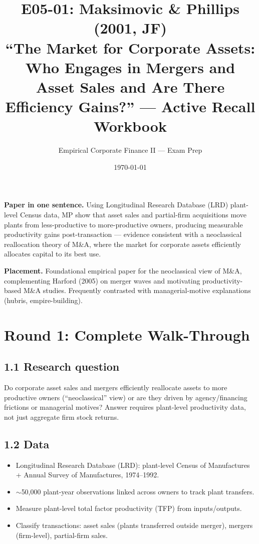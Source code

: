 \documentclass[11pt]{article}
\title{E05-01: Maksimovic \& Phillips (2001, JF) \\
\large ``The Market for Corporate Assets: Who Engages in Mergers and Asset Sales and Are There Efficiency Gains?'' --- Active Recall Workbook}
\author{Empirical Corporate Finance II --- Exam Prep}
\date{\today}
\begin{document}
\maketitle

\begin{keybox}
\textbf{Paper in one sentence.} Using Longitudinal Research Database (LRD) plant-level Census data, MP show that asset sales and partial-firm acquisitions move plants from less-productive to more-productive owners, producing measurable productivity gains post-transaction --- evidence consistent with a neoclassical reallocation theory of M\&A, where the market for corporate assets efficiently allocates capital to its best use.

\textbf{Placement.} Foundational empirical paper for the neoclassical view of M\&A, complementing Harford (2005) on merger waves and motivating productivity-based M\&A studies. Frequently contrasted with managerial-motive explanations (hubris, empire-building).
\end{keybox}

\section*{Round 1: Complete Walk-Through}

\subsection*{1.1 Research question}
Do corporate asset sales and mergers efficiently reallocate assets to more productive owners (``neoclassical'' view) or are they driven by agency/financing frictions or managerial motives? Answer requires plant-level productivity data, not just aggregate firm stock returns.

\subsection*{1.2 Data}
\begin{itemize}
\item Longitudinal Research Database (LRD): plant-level Census of Manufactures + Annual Survey of Manufactures, 1974--1992.
\item $\sim$50,000 plant-year observations linked across owners to track plant transfers.
\item Measure plant-level total factor productivity (TFP) from inputs/outputs.
\item Classify transactions: asset sales (plants transferred outside merger), mergers (firm-level), partial-firm sales.
\end{itemize}
\end{document}
